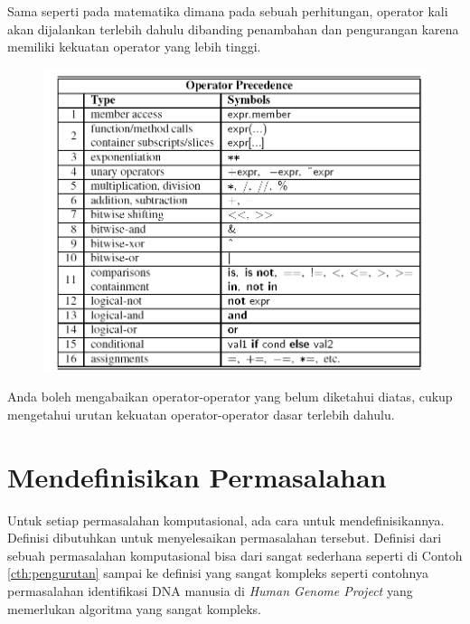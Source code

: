  Sama seperti pada matematika dimana pada sebuah perhitungan, operator kali akan dijalankan terlebih dahulu dibanding penambahan dan pengurangan karena memiliki kekuatan operator yang lebih tinggi. 
	\begin{figure}[h!]
	\includegraphics[scale=0.45]{fig/1/Gambar21.png}	
	\end{figure}	
Anda boleh mengabaikan operator-operator yang belum diketahui diatas, cukup mengetahui urutan kekuatan operator-operator dasar terlebih dahulu.	

\newpage
\section{Mendefinisikan Permasalahan}
Untuk setiap permasalahan komputasional, ada cara untuk mendefinisikannya. Definisi dibutuhkan untuk menyelesaikan permasalahan tersebut. Definisi dari sebuah permasalahan komputasional bisa dari sangat sederhana seperti di Contoh \ref{cth:pengurutan} sampai ke definisi yang sangat kompleks seperti contohnya permasalahan identifikasi DNA manusia di \textit{Human Genome Project} yang memerlukan algoritma yang sangat kompleks.

